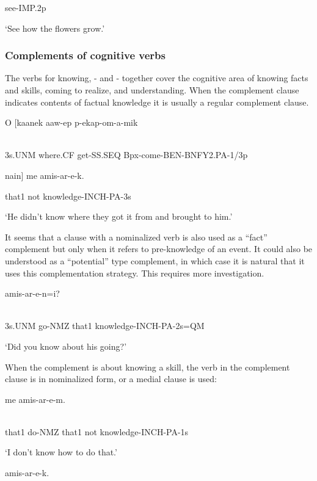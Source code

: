 see-IMP.2p

`See how the flowers grow.'

\subsubsection[Complements of cognitive verbs]{Complements of cognitive verbs}
\hypertarget{RefHeading23581935131865}{}
The verbs for knowing, - and - together cover the cognitive area of knowing facts and skills, coming to realize, and understanding. When the complement clause indicates contents of factual knowledge it is usually a regular complement clause.

\ea%
\label{ex:x1602}
\gll O  [kaanek  aaw-ep  p-ekap-om-a-mik \\
      \\
\glt
\z

3s.UNM  where.CF  get-SS.SEQ  Bpx-come-BEN-BNFY2.PA-1/3p

nain]  me  amis-ar-e-k.

that1  not  knowledge-INCH-PA-3s

`He didn't know where they got it from and brought to him.'

It seems that a clause with a nominalized verb is also used as a ``fact'' complement but only when it refers to pre-knowledge of an event. It could also be understood as a ``potential'' type complement, in which case it is natural that it uses this complementation strategy. This requires more investigation. 

\ea%
\label{ex:x1605}
  amis-ar-e-n=i? \\
      \\
\glt
\z

3s.UNM  go-NMZ  that1  knowledge-INCH-PA-2s=QM

`Did you know about his going?'

When the complement is about knowing a skill, the verb in the complement clause is in nominalized form, or a medial clause is used: 

\ea%
\label{ex:x1603}
  me  amis-ar-e-m. \\
      \\
\glt
\z

that1  do-NMZ  that1  not  knowledge-INCH-PA-1s

`I don't know how to do that.'

\ea%
\label{ex:x1849}
  amis-ar-e-k. \\
      \\
\glt
\z

